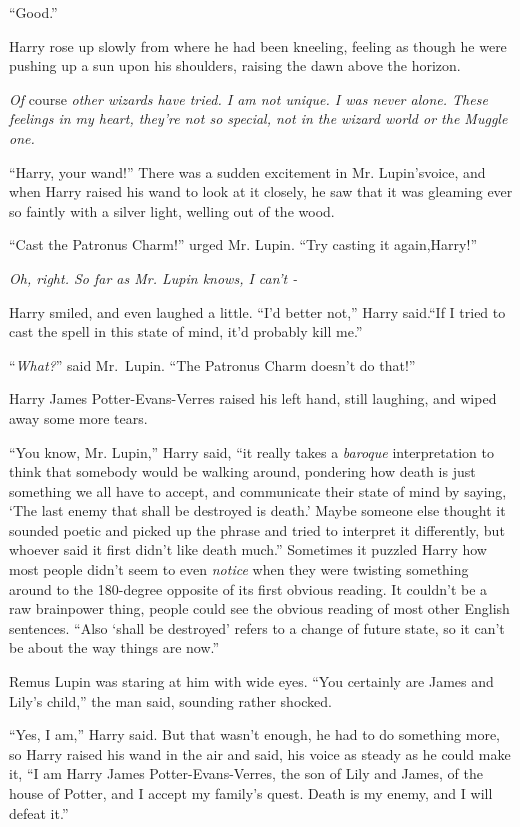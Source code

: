 “Good.”

Harry rose up slowly from where he had been kneeling, feeling as though he were pushing up a sun upon his shoulders, raising the dawn above the horizon.

\emph{Of} course \emph{other wizards have tried. I am not unique. I was never alone. These feelings in my heart, they're not so special, not in the wizard world or the Muggle one.}

“Harry, your wand!” There was a sudden excitement in Mr. Lupin'svoice, and when Harry raised his wand to look at it closely, he saw that it was gleaming ever so faintly with a silver light, welling out of the wood.

“Cast the Patronus Charm!” urged Mr. Lupin. “Try casting it again,Harry!”

\emph{Oh, right. So far as Mr. Lupin knows, I can't -}

Harry smiled, and even laughed a little. “I'd better not,” Harry said.“If I tried to cast the spell in this state of mind, it'd probably kill me.”

“\emph{What?}” said Mr.~Lupin. “The Patronus Charm doesn't do that!”

Harry James Potter-Evans-Verres raised his left hand, still laughing, and wiped away some more tears.

“You know, Mr. Lupin,” Harry said, “it really takes a \emph{baroque} interpretation to think that somebody would be walking around, pondering how death is just something we all have to accept, and communicate their state of mind by saying, `The last enemy that shall be destroyed is death.' Maybe someone else thought it sounded poetic and picked up the phrase and tried to interpret it differently, but whoever said it first didn't like death much.” Sometimes it puzzled Harry how most people didn't seem to even \emph{notice} when they were twisting something around to the 180-degree opposite of its first obvious reading. It couldn't be a raw brainpower thing, people could see the obvious reading of most other English sentences. “Also `shall be destroyed' refers to a change of future state, so it can't be about the way things are now.”

Remus Lupin was staring at him with wide eyes. “You certainly are James and Lily's child,” the man said, sounding rather shocked.

“Yes, I am,” Harry said. But that wasn't enough, he had to do something more, so Harry raised his wand in the air and said, his voice as steady as he could make it, “I am Harry James Potter-Evans-Verres, the son of Lily and James, of the house of Potter, and I accept my family's quest. Death is my enemy, and I will defeat it.”

